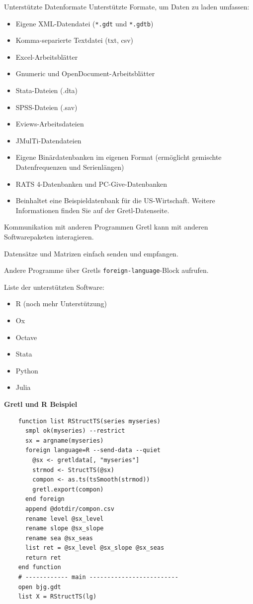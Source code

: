 \documentclass{beamer}[11pt]
\begin{document}
\begin{frame}{Unterstützte Datenformate}
	Unterstützte Formate, um Daten zu laden umfassen:

	\begin{itemize}
		\item Eigene XML-Datendatei (\texttt{*.gdt} und \texttt{*.gdtb})
		\item Komma-separierte Textdatei (txt, csv)
		\item Excel-Arbeitsblätter
		\item Gnumeric und OpenDocument-Arbeitsblätter
		\item Stata-Dateien (.dta)
		\item SPSS-Dateien (.sav)
		\item Eviews-Arbeitsdateien
		\item JMulTi-Datendateien
		\item Eigene Binärdatenbanken im eigenen Format (ermöglicht gemischte Datenfrequenzen und Serienlängen)
		\item RATS 4-Datenbanken und PC-Give-Datenbanken
		\item Beinhaltet eine Beispieldatenbank für die US-Wirtschaft. Weitere Informationen finden Sie auf der Gretl-Datenseite.
	\end{itemize}
\end{frame}


\begin{frame}{Kommunikation mit anderen Programmen}
	Gretl kann mit anderen Softwarepaketen interagieren.
	\medskip

	Datensätze und Matrizen einfach senden und empfangen.
	\medskip

	Andere Programme über Gretls \texttt{foreign-language}-Block aufrufen.
	\medskip

	Liste der unterstützten Software:

	\begin{itemize}
		\item R (noch mehr Unterstützung)
		\item Ox
		\item Octave
		\item Stata
		\item Python
		\item Julia
	\end{itemize}
\end{frame}


\begin{frame}[fragile]%
	\textbf{Gretl und R Beispiel}
	\footnotesize
	\begin{verbatim}
	function list RStructTS(series myseries)
	  smpl ok(myseries) --restrict
	  sx = argname(myseries)
	  foreign language=R --send-data --quiet
	    @sx <- gretldata[, "myseries"]
	    strmod <- StructTS(@sx)
	    compon <- as.ts(tsSmooth(strmod))
	    gretl.export(compon)
	  end foreign
	  append @dotdir/compon.csv
	  rename level @sx_level
	  rename slope @sx_slope
	  rename sea @sx_seas
	  list ret = @sx_level @sx_slope @sx_seas
	  return ret
	end function
	# ------------ main -------------------------
	open bjg.gdt
	list X = RStructTS(lg)
	\end{verbatim}
\end{frame}
\end{document}
